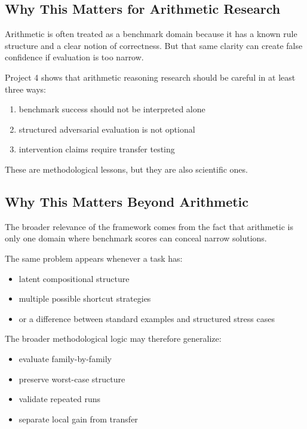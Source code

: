 \documentclass[11pt]{article}
\begin{document}
\subsection{Why This Matters for Arithmetic Research}

Arithmetic is often treated as a benchmark domain because it has a known rule structure and a clear notion of correctness. But that same clarity can create false confidence if evaluation is too narrow.

Project 4 shows that arithmetic reasoning research should be careful in at least three ways:
\begin{enumerate}[leftmargin=1.5em]
    \item benchmark success should not be interpreted alone
    \item structured adversarial evaluation is not optional
    \item intervention claims require transfer testing
\end{enumerate}

These are methodological lessons, but they are also scientific ones.

\subsection{Why This Matters Beyond Arithmetic}

The broader relevance of the framework comes from the fact that arithmetic is only one domain where benchmark scores can conceal narrow solutions.

The same problem appears whenever a task has:
\begin{itemize}[leftmargin=1.5em]
    \item latent compositional structure
    \item multiple possible shortcut strategies
    \item or a difference between standard examples and structured stress cases
\end{itemize}

The broader methodological logic may therefore generalize:
\begin{itemize}[leftmargin=1.5em]
    \item evaluate family-by-family
    \item preserve worst-case structure
    \item validate repeated runs
    \item separate local gain from transfer
\end{itemize}
\end{document}

